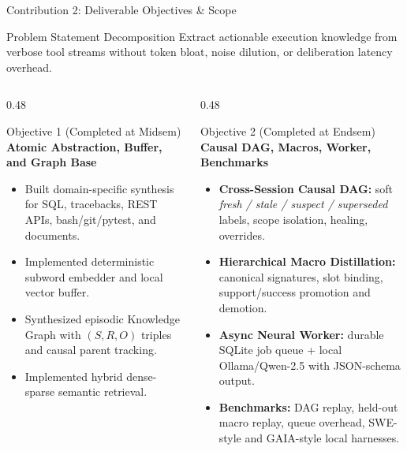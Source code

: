 \documentclass[aspectratio=169,10pt]{beamer}
\begin{document}
\begin{frame}{Contribution 2: Deliverable Objectives \& Scope}
  \begin{block}{Problem Statement Decomposition}
    Extract actionable execution knowledge from verbose tool streams without token bloat, noise dilution, or deliberation latency overhead.
  \end{block}
  \vspace{0.3em}
  \begin{columns}[T,onlytextwidth]
    \begin{column}{0.48\textwidth}
      \begin{block}{Objective 1 (Completed at Midsem)}
        \textbf{Atomic Abstraction, Buffer, and Graph Base}
        \begin{itemize}
          \footnotesize
          \item Built domain-specific synthesis for SQL, tracebacks, REST APIs, bash/git/pytest, and documents.
          \item Implemented deterministic subword embedder and local vector buffer.
          \item Synthesized episodic Knowledge Graph with $(S, R, O)$ triples and causal parent tracking.
          \item Implemented hybrid dense-sparse semantic retrieval.
        \end{itemize}
      \end{block}
    \end{column}
    \begin{column}{0.48\textwidth}
      \begin{block}{Objective 2 (Completed at Endsem)}
        \textbf{Causal DAG, Macros, Worker, Benchmarks}
        \begin{itemize}
          \footnotesize
          \item \textbf{Cross-Session Causal DAG:} soft \textit{fresh / stale / suspect / superseded} labels, scope isolation, healing, overrides.
          \item \textbf{Hierarchical Macro Distillation:} canonical signatures, slot binding, support/success promotion and demotion.
          \item \textbf{Async Neural Worker:} durable SQLite job queue + local Ollama/Qwen-2.5 with JSON-schema output.
          \item \textbf{Benchmarks:} DAG replay, held-out macro replay, queue overhead, SWE-style and GAIA-style local harnesses.
        \end{itemize}
      \end{block}
    \end{column}
  \end{columns}
\end{frame}
\end{document}
